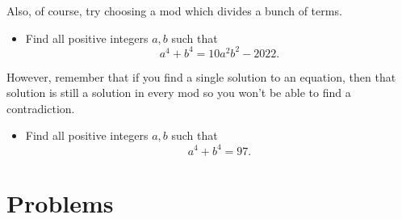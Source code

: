 \documentclass{article}
\begin{document}
  Also, of course, try choosing a mod which divides a bunch of terms.
  \begin{itemize}
    \item Find all positive integers $a,b$ such that
      \[a^4+b^4=10a^2b^2-2022.\]
  \end{itemize}

  However, remember that if you find a single solution to an equation, then that
  solution is still a solution in every mod so you won't be able to find a
  contradiction.
  \begin{itemize}
    \item Find all positive integers $a,b$ such that
      \[a^4+b^4=97.\]
  \end{itemize}
\newpage
\section{Problems}
\end{document}
